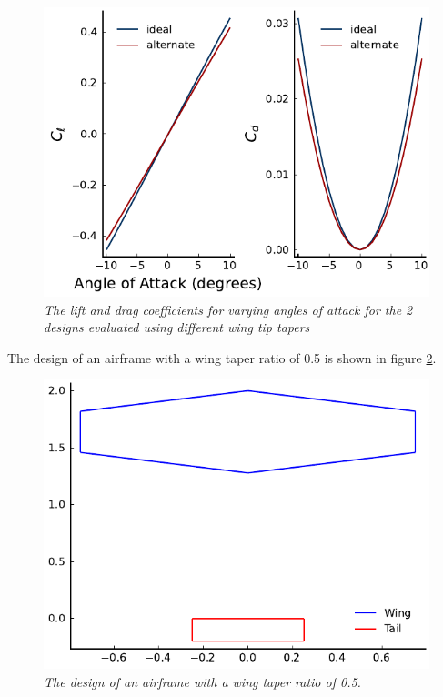 \documentclass{journal}
\begin{document}
	\begin{figure}[H]
		\includegraphics{../graphics/taper_coeff.pdf}
		\caption{\emph{The lift and drag coefficients for varying angles of attack for the 2 designs evaluated using different wing tip tapers}}
		\label{fig:taper_coeff}
	\end{figure}
	
	The design of an airframe with a wing taper ratio of 0.5 is shown in figure \ref{fig:taper_design}.
	
	\begin{figure}[H]
		\includegraphics{../graphics/taper_design.pdf}
		\caption{\emph{The design of an airframe with a wing taper ratio of 0.5.}}
		\label{fig:taper_design}
	\end{figure}
	
\end{document}
